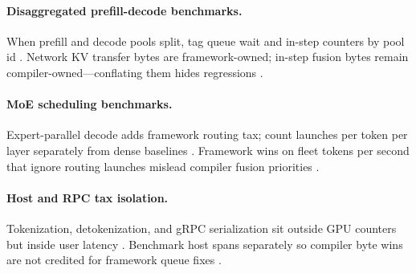 \paragraph{Disaggregated prefill-decode benchmarks.} When prefill and decode pools split, tag queue wait and in-step counters by pool id \citep{liu2024deepseekv3,patel2025llminference,kwon2023vllm,yirage2026,chen2020compilerbasedhardw,memoryfloor2026,taxbreak2026,liu2024deepseekv3,nvidia2024cudagraphs,dao2022flashattention,amd2024xdna,amd2024aie,dlbook,dao2023flashdecoding,nvidia2022hopper,semianalysis2024tma}. Network KV transfer bytes are framework-owned; in-step fusion bytes remain compiler-owned---conflating them hides regressions \citep{liu2024deepseekv3,patel2025llminference,yirage2026,chen2020compilerbasedhardw,kwon2023vllm,memoryfloor2026,taxbreak2026,dlbook}.

\paragraph{MoE scheduling benchmarks.} Expert-parallel decode adds framework routing tax; count launches per token per layer separately from dense baselines \citep{liu2024deepseekv3,taxbreak2026,patel2025llminference,kwon2023vllm,yirage2026,chen2020compilerbasedhardw,memoryfloor2026,nvidia2024cudagraphs,dao2022flashattention,amd2024aie,amd2024xdna,dlbook,dao2023flashdecoding,nvidia2022hopper,semianalysis2024tma}. Framework wins on fleet tokens per second that ignore routing launches mislead compiler fusion priorities \citep{liu2024deepseekv3,yirage2026,chen2020compilerbasedhardw,patel2025llminference,kwon2023vllm,memoryfloor2026,taxbreak2026,dlbook}.

\paragraph{Host and RPC tax isolation.} Tokenization, detokenization, and gRPC serialization sit outside GPU counters but inside user latency \citep{patel2025llminference,dlbook,kwon2023vllm,memoryfloor2026,taxbreak2026,yirage2026,chen2020compilerbasedhardw,liu2024deepseekv3,nvidia2024cudagraphs,dao2022flashattention,amd2024aie,amd2024xdna,dlbook,dao2023flashdecoding,nvidia2022hopper,semianalysis2024tma}. Benchmark host spans separately so compiler byte wins are not credited for framework queue fixes \citep{patel2025llminference,taxbreak2026,memoryfloor2026,yirage2026,chen2020compilerbasedhardw,kwon2023vllm,dlbook}.

